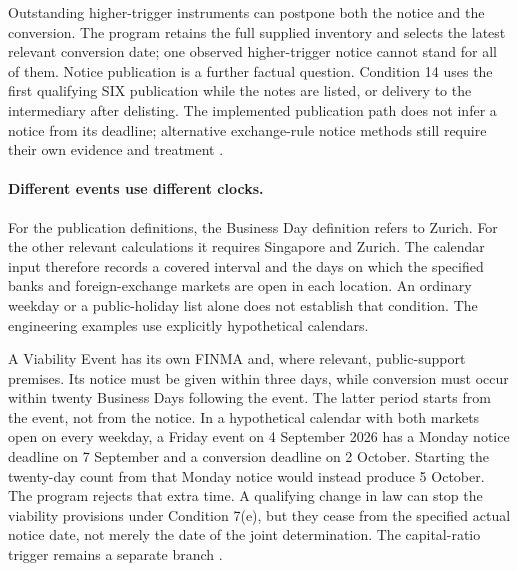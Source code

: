 \documentclass[12pt,a4paper,oneside,openany]{book}
\begin{document}
Outstanding higher-trigger instruments can postpone both the notice and the
conversion. The program retains the full supplied inventory and selects the
latest relevant conversion date; one observed higher-trigger notice cannot
stand for all of them. Notice publication is a further factual question.
Condition 14 uses the first qualifying SIX publication while the notes are
listed, or delivery to the intermediary after delisting. The implemented
publication path does not infer a notice from its deadline; alternative
exchange-rule notice methods still require their own evidence and treatment
\citep[conditions~7(a)--(b), 14]{ubsat12024}.

\paragraph{Different events use different clocks.}
For the publication definitions, the Business Day definition refers to Zurich.
For the other relevant calculations it requires Singapore and Zurich.
The calendar input therefore records a covered interval and the days on which
the specified banks and foreign-exchange markets are open in each location.
An ordinary weekday or a public-holiday list alone does not establish that
condition. The engineering examples use explicitly hypothetical calendars.

A Viability Event has its own FINMA and, where relevant, public-support
premises. Its notice must be given within three days, while conversion must
occur within twenty Business Days following the event. The latter period
starts from the event, not from the notice. In a hypothetical calendar with
both markets open on every weekday, a Friday event on 4 September 2026 has a
Monday notice deadline on 7 September and a conversion deadline on 2 October.
Starting the twenty-day count from that Monday notice would instead produce
5 October. The program rejects that extra time. A qualifying change in law
can stop the viability provisions under Condition 7(e), but they cease from
the specified actual notice date, not merely the date of the joint
determination. The capital-ratio trigger remains a separate branch
\citep[Business Day definition; conditions~7(c), 7(e)]{ubsat12024}.
\end{document}
